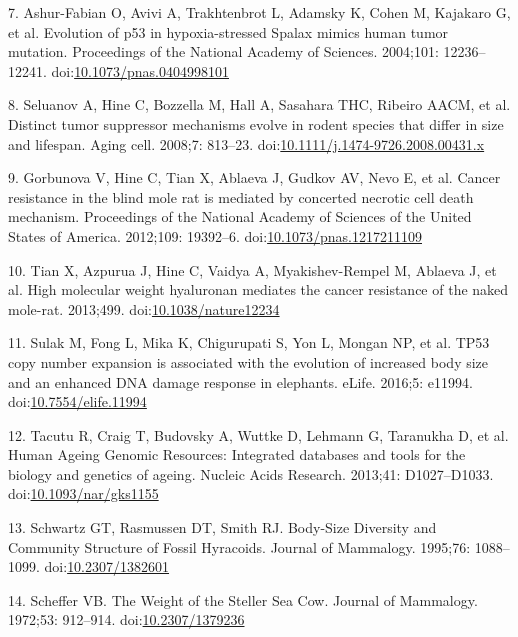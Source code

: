\documentclass[10pt,letterpaper]{article}
\begin{document}
\leavevmode\hypertarget{ref-Ashur-Fabian2004}{}%
7. Ashur-Fabian O, Avivi A, Trakhtenbrot L, Adamsky K, Cohen M, Kajakaro
G, et al. Evolution of p53 in hypoxia-stressed Spalax mimics human tumor
mutation. Proceedings of the National Academy of Sciences. 2004;101:
12236--12241.
doi:\href{https://doi.org/10.1073/pnas.0404998101}{10.1073/pnas.0404998101}

\leavevmode\hypertarget{ref-Seluanov2008}{}%
8. Seluanov A, Hine C, Bozzella M, Hall A, Sasahara THC, Ribeiro AACM,
et al. Distinct tumor suppressor mechanisms evolve in rodent species
that differ in size and lifespan. Aging cell. 2008;7: 813--23.
doi:\href{https://doi.org/10.1111/j.1474-9726.2008.00431.x}{10.1111/j.1474-9726.2008.00431.x}

\leavevmode\hypertarget{ref-Gorbunova2012}{}%
9. Gorbunova V, Hine C, Tian X, Ablaeva J, Gudkov AV, Nevo E, et al.
Cancer resistance in the blind mole rat is mediated by concerted
necrotic cell death mechanism. Proceedings of the National Academy of
Sciences of the United States of America. 2012;109: 19392--6.
doi:\href{https://doi.org/10.1073/pnas.1217211109}{10.1073/pnas.1217211109}

\leavevmode\hypertarget{ref-Tian2013}{}%
10. Tian X, Azpurua J, Hine C, Vaidya A, Myakishev-Rempel M, Ablaeva J,
et al. High molecular weight hyaluronan mediates the cancer resistance
of the naked mole-rat. 2013;499.
doi:\href{https://doi.org/10.1038/nature12234}{10.1038/nature12234}

\leavevmode\hypertarget{ref-Sulak2016}{}%
11. Sulak M, Fong L, Mika K, Chigurupati S, Yon L, Mongan NP, et al.
TP53 copy number expansion is associated with the evolution of increased
body size and an enhanced DNA damage response in elephants. eLife.
2016;5: e11994.
doi:\href{https://doi.org/10.7554/elife.11994}{10.7554/elife.11994}

\leavevmode\hypertarget{ref-HAGR}{}%
12. Tacutu R, Craig T, Budovsky A, Wuttke D, Lehmann G, Taranukha D, et
al. Human Ageing Genomic Resources: Integrated databases and tools for
the biology and genetics of ageing. Nucleic Acids Research. 2013;41:
D1027--D1033.
doi:\href{https://doi.org/10.1093/nar/gks1155}{10.1093/nar/gks1155}

\leavevmode\hypertarget{ref-Schwartz1995}{}%
13. Schwartz GT, Rasmussen DT, Smith RJ. Body-Size Diversity and
Community Structure of Fossil Hyracoids. Journal of Mammalogy. 1995;76:
1088--1099. doi:\href{https://doi.org/10.2307/1382601}{10.2307/1382601}

\leavevmode\hypertarget{ref-Scheffer1972}{}%
14. Scheffer VB. The Weight of the Steller Sea Cow. Journal of
Mammalogy. 1972;53: 912--914.
doi:\href{https://doi.org/10.2307/1379236}{10.2307/1379236}
\end{document}
